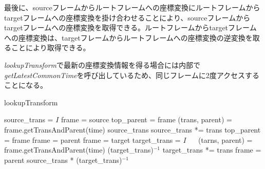 \documentclass[a4paper]{jreport}	%
\begin{document}
最後に、sourceフレームからルートフレームへの座標変換にルートフレームからtargetフレームへの座標変換を掛け合わせることにより、sourceフレームからtargetフレームへの座標変換を取得できる。ルートフレームからtargetフレームへの座標変換は、targetフレームからルートフレームへの座標変換の逆変換を取ることにより取得できる。

\textit{lookupTransform}で最新の座標変換情報を得る場合には内部で\textit{getLatestCommonTime}を呼び出しているため、同じフレームに2度アクセスすることになる。

\begin{algorithm}
\caption{lookupTransform} \label{algo:lookupTransform}
\begin{algorithmic}[1]
	 
	 
	 \label{code:getLatest}
	\EndIf
	\State source\_trans = $I$ 
	\State frame = source
	\State top\_parent = frame
	  \label{code:lookupTrans-s-r}
	\State (trans, parent) = frame.getTransAndParent(time)
	  \label{code:lookupTrans-t-p-of-s}
	\State \Return source\_trans
	\EndIf 
	\State source\_trans *= trans 
	\State top\_parent = frame
	\State frame = parent
	\EndWhile \label{code:lookupTrans-s-r2}
	\State frame = target
	\State target\_trans = $I$
	　 \label{code:lookupTrans-t-r}
	\State (tarns, parent) = frame.getTransAndParent(time)
	   \label{code:lookupTrans-s-p-of-t}
	\State \Return (target\_trans)$^{-1}$
	\EndIf 
	\State target\_trans *= trans
	\State frame = parent
	\EndWhile \label{code:lookupTrans-t-r2}
	\State \Return source\_trans * (target\_trans)$^{-1}$ 
	\EndFunction
\end{algorithmic}
\end{algorithm}
\end{document}
